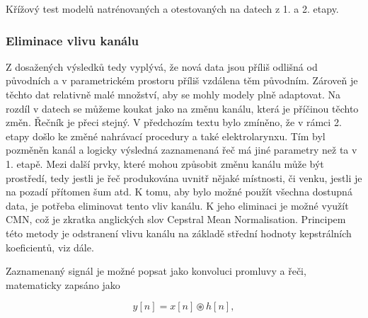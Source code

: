 
\begin{table}[htpb]
  \centering
  \def\arraystretch{1.5}
  \caption{Křížový test modelů natrénovaných a otestovaných na datech z 1. a 2. etapy.}
  \label{tab:experiments:normalization:cross}
\end{table}


\subsubsection{Eliminace vlivu kanálu}

Z dosažených výsledků tedy vyplývá, že nová data jsou příliš odlišná od původních a v parametrickém prostoru příliš vzdálena těm původním. Zároveň je těchto dat relativně malé množství, aby se mohly modely plně adaptovat. Na rozdíl v datech se můžeme koukat jako na změnu kanálu, která je příčinou těchto změn. Řečník je přeci stejný. V předchozím textu bylo zmíněno, že v rámci 2. etapy došlo ke změné nahrávací procedury a také elektrolarynxu. Tím byl pozměněn kanál a logicky výsledná zaznamenaná řeč má jiné parametry než ta v 1. etapě. Mezi další prvky, které mohou způsobit změnu kanálu může být prostředí, tedy jestli je řeč produkována uvnitř nějaké místnosti, či venku, jestli je na pozadí přítomen šum atd. K tomu, aby bylo možné použít všechna dostupná data, je potřeba eliminovat tento vliv kanálu. K jeho eliminaci je možné využít CMN, což je zkratka anglických slov Cepstral Mean Normalisation. Principem této metody je odstranení vlivu kanálu na základě střední hodnoty kepstrálních koeficientů, viz dále.

Zaznamenaný signál je možné popsat jako konvoluci promluvy a řeči, matematicky zapsáno jako

\begin{equation}
  y\left[n\right] = x\left[n\right] \circledast h\left[n\right],
  \label{eq:experiments:normalization:convolution}
\end{equation}

